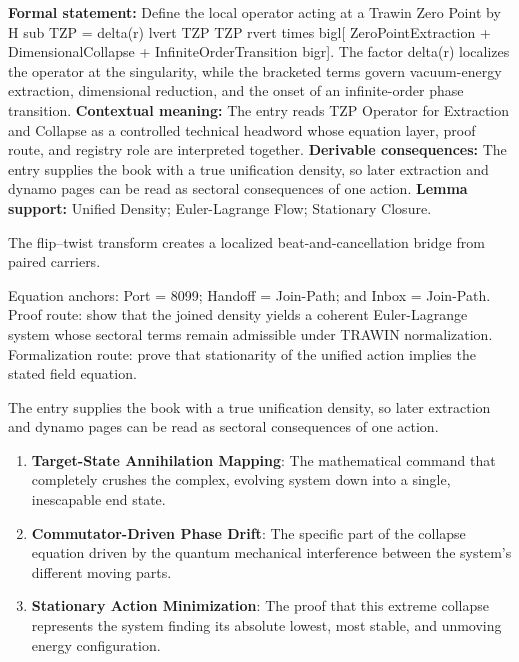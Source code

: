 \begingroup\footnotesize\setlength{\emergencystretch}{3em}\sloppy
\textbf{Formal statement:} Define the local operator acting at a Trawin Zero Point by H sub TZP = delta(r) lvert TZP TZP rvert times bigl[ ZeroPointExtraction + DimensionalCollapse + InfiniteOrderTransition bigr]. The factor delta(r) localizes the operator at the singularity, while the bracketed terms govern vacuum-energy extraction, dimensional reduction, and the onset of an infinite-order phase transition. \textbf{Contextual meaning:} The entry reads TZP Operator for Extraction and Collapse as a controlled technical headword whose equation layer, proof route, and registry role are interpreted together. \textbf{Derivable consequences:} The entry supplies the book with a true unification density, so later extraction and dynamo pages can be read as sectoral consequences of one action. \textbf{Lemma support:} Unified Density; Euler-Lagrange Flow; Stationary Closure.\par
\endgroup

The flip--twist transform creates a localized beat-and-cancellation bridge from paired carriers.

Equation anchors: Port = 8099; Handoff = Join-Path; and Inbox = Join-Path. Proof route: show that the joined density yields a coherent Euler-Lagrange system whose sectoral terms remain admissible under TRAWIN normalization. Formalization route: prove that stationarity of the unified action implies the stated field equation.

The entry supplies the book with a true unification density, so later extraction and dynamo pages can be read as sectoral consequences of one action.
\endgroup

\begin{enumerate}[leftmargin=1.6em,itemsep=6pt,topsep=4pt]
\item \textbf{Target-State Annihilation Mapping}: The mathematical command that completely crushes the complex, evolving system down into a single, inescapable end state.
\item \textbf{Commutator-Driven Phase Drift}: The specific part of the collapse equation driven by the quantum mechanical interference between the system's different moving parts.
\item \textbf{Stationary Action Minimization}: The proof that this extreme collapse represents the system finding its absolute lowest, most stable, and unmoving energy configuration.
\end{enumerate}

